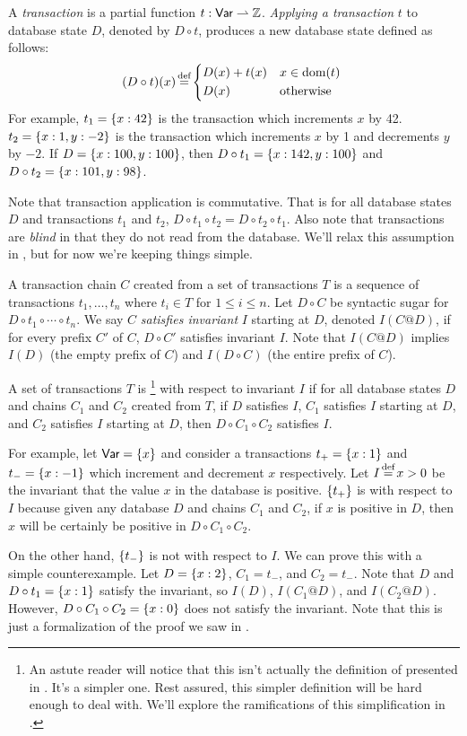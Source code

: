 A \emph{transaction} is a partial function $t: \textsf{Var} \rightharpoonup \mathbb{Z}$.
\emph{Applying a transaction} $t$ to database state $D$, denoted by $D \circ
t$, produces a new database state defined as follows:
\[
  (D \circ t)(x) \defeq \begin{cases*}
    D(x) + t(x) & $x \in \dom{}(t)$ \\
    D(x)        & otherwise
  \end{cases*}
\]
For example, $t_1 = \left\{x: 42\right\}$ is the transaction which increments $x$ by 42.
$t_2 = \left\{x: 1, y:-2\right\}$ is the transaction which increments $x$ by 1 and
decrements $y$ by $-2$. If $D = \left\{x: 100, y:100\right\}$, then $D \circ t_1 =
\left\{x:142, y:100\right\}$ and $D \circ t_2 = \left\{x:101, y:98\right\}$.

Note that transaction application is commutative. That is for all database
states $D$ and transactions $t_1$ and $t_2$, $D \circ t_1 \circ t_2 = D \circ
t_2 \circ t_1$. Also note that transactions are \emph{blind} in that they do
not read from the database. We'll relax this assumption in , but
for now we're keeping things simple.

A transaction chain $C$ created from a set of transactions $T$ is a sequence of
transactions $t_1, \ldots, t_n$ where $t_i \in T$ for $1 \leq i \leq n$. Let $D
\circ C$ be syntactic sugar for $D \circ t_1 \circ \cdots \circ t_n$. We say
$C$ \emph{satisfies invariant} $I$ starting at $D$, denoted $I(C @ D)$, if for
every prefix $C'$ of $C$, $D \circ C'$ satisfies invariant $I$. Note that $I(C
@ D)$ implies $I(D)$ (the empty prefix of $C$) and $I(D \circ C)$ (the entire
prefix of $C$).

A set of transactions $T$ is \emph{\iconfluent{}}\footnote{An astute reader
will notice that this isn't actually the definition of \iconfluence{} presented
in \cite{bailis2014coordination}. It's a simpler one. Rest assured, this
simpler definition will be hard enough to deal with. We'll explore the
ramifications of this simplification in .} with respect to
invariant $I$ if for all database states $D$ and chains $C_1$ and $C_2$ created
from $T$, if $D$ satisfies $I$, $C_1$ satisfies $I$ starting at $D$, and $C_2$
satisfies $I$ starting at $D$, then $D \circ C_1 \circ C_2$ satisfies $I$.

For example, let $\textsf{Var} = \left\{x\right\}$ and consider a transactions $t_+ = \left\{x:
1\right\}$ and $t_- = \left\{x: -1\right\}$ which increment and decrement $x$ respectively. Let
$I \defeq x > 0$ be the invariant that the value $x$ in the database is
positive.
%
$\left\{t_+\right\}$ is \iconfluent{} with respect to $I$ because given any database $D$
and chains $C_1$ and $C_2$, if $x$ is positive in $D$, then $x$ will be
certainly be positive in $D \circ C_1 \circ C_2$.

On the other hand, $\left\{t_-\right\}$ is not \iconfluent{} with respect to $I$. We can
prove this with a simple counterexample. Let
  $D = \left\{x:2\right\}$,
  $C_1 = t_-$, and
  $C_2 = t_-$.
Note that $D$ and $D \circ t_1 = \left\{x:1\right\}$ satisfy the invariant, so $I(D)$,
$I(C_1 @ D)$, and $I(C_2 @ D)$. However, $D \circ C_1 \circ C_2 = \left\{x: 0\right\}$
does not satisfy the invariant. Note that this is just a formalization of the
proof we saw in .
